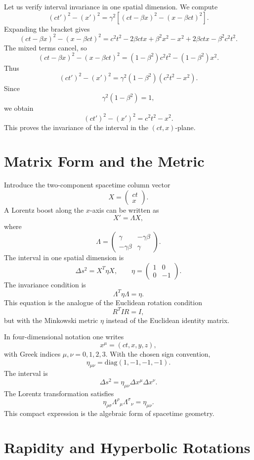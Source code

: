 Let us verify interval invariance in one spatial dimension.  We compute
\[
(c t')^2-(x')^2
=\gamma^2\left[(ct-\beta x)^2-(x-\beta ct)^2\right].
\]
Expanding the bracket gives
\[
(ct-\beta x)^2-(x-\beta ct)^2
=c^2t^2-2\beta ctx+\beta^2x^2-x^2+2\beta ctx-\beta^2c^2t^2.
\]
The mixed terms cancel, so
\[
(ct-\beta x)^2-(x-\beta ct)^2
=(1-\beta^2)c^2t^2-(1-\beta^2)x^2.
\]
Thus
\[
(c t')^2-(x')^2
=\gamma^2(1-\beta^2)(c^2t^2-x^2).
\]
Since
\[
\gamma^2(1-\beta^2)=1,
\]
we obtain
\[
(c t')^2-(x')^2=c^2t^2-x^2.
\]
This proves the invariance of the interval in the \((ct,x)\)-plane.

\clearpage

\section{Matrix Form and the Metric}

Introduce the two-component spacetime column vector
\[
X=\begin{pmatrix} ct \\ x \end{pmatrix}.
\]
A Lorentz boost along the \(x\)-axis can be written as
\[
X'=\Lambda X,
\]
where
\[
\Lambda=
\begin{pmatrix}
\gamma & -\gamma\beta \\
-\gamma\beta & \gamma
\end{pmatrix}.
\]
The interval in one spatial dimension is
\[
\Delta s^2=X^{T}\eta X,
\qquad
\eta=\begin{pmatrix}1&0\\0&-1\end{pmatrix}.
\]
The invariance condition is
\[
\Lambda^{T}\eta\Lambda=\eta.
\]
This equation is the analogue of the Euclidean rotation condition
\[
R^{T}IR=I,
\]
but with the Minkowski metric \(\eta\) instead of the Euclidean identity matrix.

In four-dimensional notation one writes
\[
x^\mu=(ct,x,y,z),
\]
with Greek indices \(\mu,\nu=0,1,2,3\).  With the chosen sign convention,
\[
\eta_{\mu\nu}=\mathrm{diag}(1,-1,-1,-1).
\]
The interval is
\[
\Delta s^2=\eta_{\mu\nu}\Delta x^\mu\Delta x^\nu.
\]
The Lorentz transformation satisfies
\[
\eta_{\rho\sigma}\Lambda^\rho{}_{\mu}\Lambda^\sigma{}_{\nu}=\eta_{\mu\nu}.
\]
This compact expression is the algebraic form of spacetime geometry.

\clearpage

\section{Rapidity and Hyperbolic Rotations}

